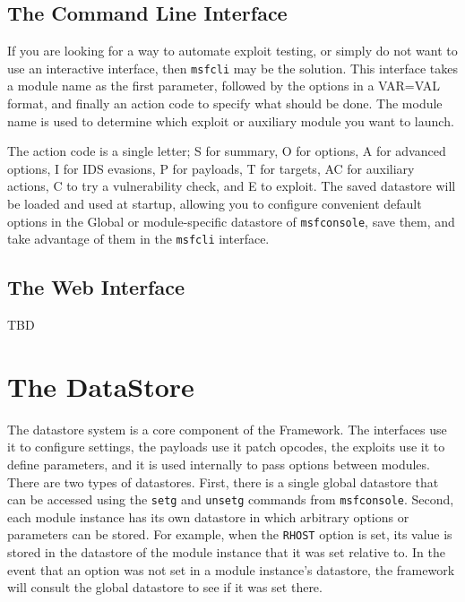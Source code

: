\documentclass{report}
\begin{document}
    \section{The Command Line Interface}
    \label{STARTED-CLI}

\par
If you are looking for a way to automate exploit testing, or simply do not want
to use an interactive interface, then \texttt{msfcli} may be the solution. This
interface takes a module name as the first parameter, followed by the options
in a VAR=VAL format, and finally an action code to specify what should be done.
The module name is used to determine which exploit or auxiliary module you
want to launch.

\par
The action code is a single letter; S for summary, O for options, A for advanced
options, I for IDS evasions, P for payloads, T for targets, AC for auxiliary
actions, C to try a vulnerability check, and E to exploit. The saved
datastore will be loaded and used at startup, allowing you to configure
convenient default options in the Global or module-specific datastore of
\texttt{msfconsole}, save them, and take advantage of them in the
\texttt{msfcli} interface. 

    \section{The Web Interface}
    \label{STARTED-WEB}

\par
TBD

\pagebreak
\chapter{The DataStore}

\par
The datastore system is a core component of the Framework.  The interfaces use
it to configure settings, the payloads use it patch opcodes, the exploits
use it to define parameters, and it is used internally to pass options between
modules.  There are two types of datastores.  First, there is a single global
datastore that can be accessed using the \texttt{setg} and \texttt{unsetg}
commands from \texttt{msfconsole}.  Second, each module instance has its own
datastore in which arbitrary options or parameters can be stored.  For
example, when the \texttt{RHOST} option is set, its value is stored in the
datastore of the module instance that it was set relative to.  In the event
that an option was not set in a module instance's datastore, the framework
will consult the global datastore to see if it was set there.
\end{document}
